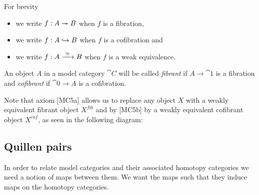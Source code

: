 \begin{notation} For brevity
	\begin{itemize}
		\item we write $f: A \twoheadrightarrow B$ when $f$ is a fibration,
		\item we write $f: A \hookrightarrow B$ when $f$ is a cofibration and
		\item we write $f: A \xrightarrow{\,\,{\simeq}\,\,} B$ when $f$ is a weak equivalence.
	\end{itemize}
\end{notation}

\begin{definition}
	An object $A$ in a model category $\cat{C}$ will be called \emph{fibrant} if $A \to \cat{1}$ is a fibration and \emph{cofibrant} if $\cat{0} \to A$ is a cofibration.
\end{definition}

Note that axiom [MC5a] allows us to replace any object $X$ with a weakly equivalent fibrant object $X^{fib}$ and by [MC5b] by a weakly equivalent cofibrant object $X^{cof}$, as seen in the following diagram:

\begin{center}
\quad
{}
\end{center}



\subsection{Quillen pairs}
In order to relate model categories and their associated homotopy categories we need a notion of maps between them. We want the maps such that they induce maps on the homotopy categories.
